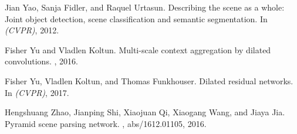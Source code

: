 \documentclass[10pt,twocolumn,letterpaper]{article}
\begin{document}
{\begin{thebibliography}{10}
Jian Yao, Sanja Fidler, and Raquel Urtasun.
\newblock Describing the scene as a whole: Joint object detection, scene
  classification and semantic segmentation.
\newblock In {\em (CVPR)}, 2012.

Fisher Yu and Vladlen Koltun.
\newblock Multi-scale context aggregation by dilated convolutions.
, 2016.

Fisher Yu, Vladlen Koltun, and Thomas Funkhouser.
\newblock Dilated residual networks.
\newblock In {\em (CVPR)}, 2017.

Hengshuang Zhao, Jianping Shi, Xiaojuan Qi, Xiaogang Wang, and Jiaya Jia.
\newblock Pyramid scene parsing network.
, abs/1612.01105, 2016.

\end{thebibliography}
 }
\end{document}
